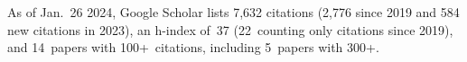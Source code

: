 %
As of Jan.~26 2024, Google Scholar lists
7,632 citations (2,776 since 2019 and 584 new citations in 2023),
an h-index of~37 (22~counting only citations since 2019),
and 14~papers with 100+~citations, including 5~papers with 300+.
